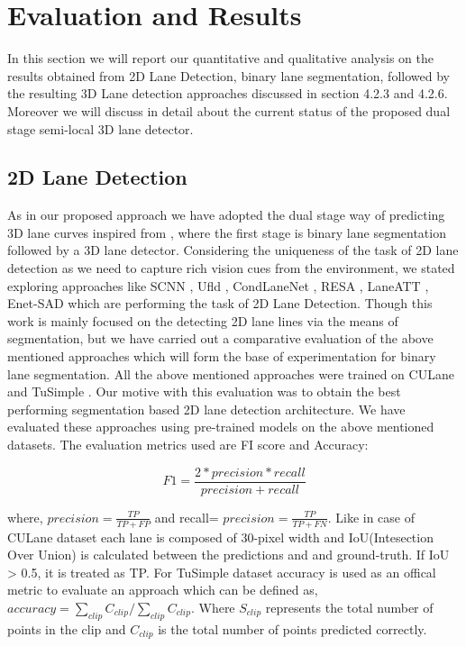 

    \chapter{Evaluation and Results}
    
    In this section we will report our quantitative and qualitative analysis on the results obtained from 2D Lane Detection, binary lane segmentation, followed by the resulting 3D Lane detection approaches discussed in section 4.2.3 and 4.2.6. Moreover we will discuss in detail about the current status of the proposed dual stage semi-local 3D lane detector. 
    
    \section{2D Lane Detection}
    As in our proposed approach we have adopted the dual stage way of predicting 3D lane curves inspired from \cite{guo2020gen}, where the first stage is binary lane segmentation followed by a 3D lane detector. Considering the uniqueness of the task of 2D lane detection as we need to capture rich vision cues from the environment, we stated exploring approaches like SCNN \cite{}, Ufld \cite{}, CondLaneNet \cite{}, RESA \cite{},  LaneATT \cite{}, Enet-SAD \cite{} which are performing the task of 2D Lane Detection. Though this work is mainly focused on the detecting 2D lane lines via the means of segmentation, but we have carried out a comparative evaluation of the above mentioned approaches which will form the base of experimentation for binary lane segmentation. All the above mentioned approaches were trained on  CULane \cite{} and TuSimple \cite{}. Our motive with this evaluation was to obtain the best performing segmentation based 2D lane detection architecture. We have evaluated these approaches using pre-trained models on the above mentioned datasets. The evaluation metrics used are FI score and Accuracy: 
    
    \begin{equation}
        F1 = \frac{2*precision * recall}{precision + recall}
    \end{equation}
    
where, $precision = \frac{TP}{TP + FP}$ and recall= $precision = \frac{TP}{TP + FN}$. Like in case of CULane \cite{} dataset each lane is composed of 30-pixel width and IoU(Intesection Over Union) is calculated between the predictions and and ground-truth. If IoU > 0.5, it is treated as TP. 
For TuSimple dataset accuracy is used as an offical metric to evaluate an approach which can be defined as, $accuracy = \sum_{clip} C_{clip} / \sum_{clip} C_{clip}$. Where $S_{clip}$ represents the total number of points in the clip and $C_{clip}$ is the total number of points predicted correctly. 

